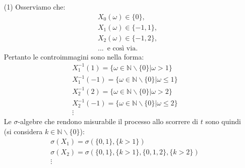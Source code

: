 \documentclass[11pt,largemargins]{homework}
\begin{document}
  \begin{enumerate}
  \item[(1)]
  Osserviamo che:
  \begin{align*}
  &X_{0}\left(\omega\right)\in\{0\},\\
  &X_{1}\left(\omega\right)\in\{-1,1\},\\
  &X_{2}\left(\omega\right)\in\{-1,2\},\\
  &...\,\,\,\text{e così via}.
  \end{align*}
  Pertanto le controimmagini sono nella forma:
  \begin{gather*}
    X_1^{-1}(1) = \{ \omega \in \mathbb{N} \backslash \{0\} | \omega > 1\}\\
    X_1^{-1}(-1) = \{ \omega \in \mathbb{N} \backslash \{0\} | \omega \leq 1\}\\
    X_2^{-1}(2) = \{ \omega \in \mathbb{N} \backslash \{0\} | \omega > 2\}\\
    X_2^{-1}(-1) = \{ \omega \in \mathbb{N} \backslash \{0\} | \omega \leq 2\}\\
    \vdots
  \end{gather*}
  Le \(\sigma\)-algebre che rendono misurabile il processo allo scorrere di \(t\) sono quindi (si considera \(k \in \mathbb{N}\backslash\{0\}\)):
  \begin{gather*}
    \sigma (X_1) = \sigma (\{0, 1\}, \{k > 1\})\\
    \sigma (X_2) = \sigma (\{0, 1\}, \{k > 1\}, \{0, 1, 2\}, \{k > 2\})\\
    \vdots
  \end{gather*}


\end{enumerate}
\end{document}
